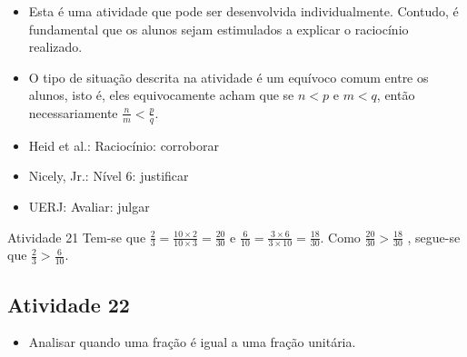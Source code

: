\begin{multicols}{2}
  
  
\begin{itemize} %
    \item       Esta é uma atividade que pode ser desenvolvida individualmente. 
Contudo, é fundamental que os alunos sejam estimulados a explicar o raciocínio 
realizado.
    \item       O tipo de situação descrita na atividade é um equívoco comum 
entre os alunos, isto é, eles equivocamente acham que se       $n < p$       e   
    $m < q$, então necessariamente       $\frac{n}{m} < \frac{p}{q}$.
\end{itemize} %
  
  
   \vspace{.1cm}
  
 \vspace{.1cm}
   
\begin{itemize} %
    \item       Heid et al.: Raciocínio: corroborar
    \item       Nicely, Jr.: Nível 6: justificar
    \item       UERJ: Avaliar: julgar
\end{itemize} %

\begin{resposta*}{Atividade 21}
  Tem-se que   $\frac{2}{3} = \frac{10 \times 2}{10 \times 3} = \frac{20}{30}$   
e  
  $\frac{6}{10} = \frac{3 \times 6}{3 \times 10} = \frac{18}{30}$.  
  Como   $\frac{20}{30} > \frac{18}{30}$  , segue-se que   $\frac{2}{3} > 
\frac{6}{10}$.  
\end{resposta*}

\subsection{Atividade 22}

\begin{itemize} %
    \item       Analisar quando uma fração é igual a uma fração unitária.
\end{itemize} %
  
  
 

\end{multicols}
